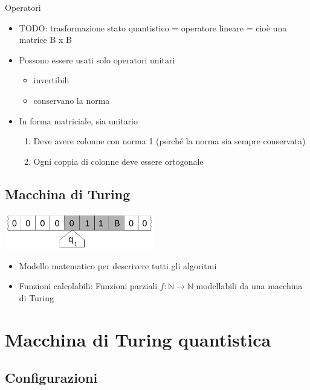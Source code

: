 \documentclass{beamer}
\begin{document}
\begin{frame}{\subsecname}{Operatori}
	\begin{itemize}
		\item TODO: trasformazione stato quantistico = operatore lineare = cioè una matrice B x B
		\item Possono essere usati solo \alert{operatori unitari}
		\begin{itemize}
			\item invertibili
			\item conservano la norma
		\end{itemize}
		\item In forma matriciale, sia unitario
		\begin{enumerate}
			\item Deve avere colonne con norma 1 (perché la norma sia sempre conservata)
			\item Ogni coppia di colonne deve essere ortogonale
		\end{enumerate}
	\end{itemize}
\end{frame}

\subsection{Macchina di Turing}

\begin{frame}{\subsecname}{}
	\centering\includegraphics[width=6.5cm]{Turing_machine_2b.png}
	\begin{itemize}
		\item Modello matematico per descrivere tutti gli algoritmi
		\item \alert{Funzioni calcolabili}: Funzioni parziali \( f : \mathbb{N} \rightarrow \mathbb{N} \) modellabili da una macchina di Turing
	\end{itemize}
\end{frame}

\section{Macchina di Turing quantistica}

\subsection{Configurazioni}
\end{document}
